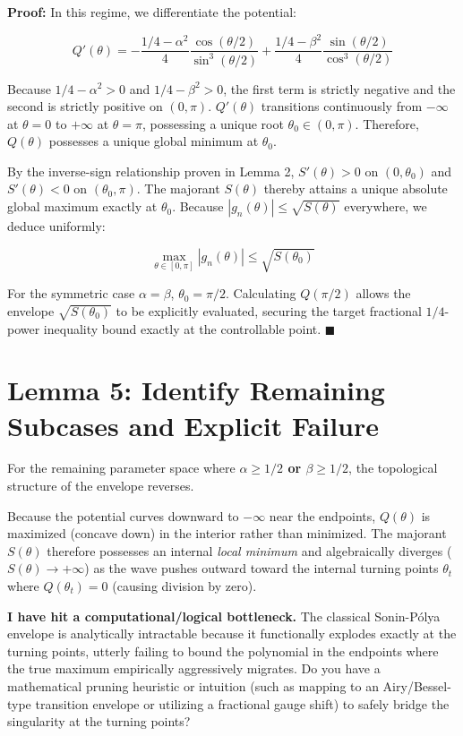 \documentclass[11pt]{article}
\begin{document}
\textbf{Proof:}
In this regime, we differentiate the potential:


\begin{equation*}
Q'(\theta) = - \frac{1/4-\alpha^2}{4} \frac{\cos(\theta/2)}{\sin^3(\theta/2)} + \frac{1/4-\beta^2}{4} \frac{\sin(\theta/2)}{\cos^3(\theta/2)}
\end{equation*}


Because \(1/4 - \alpha^2 > 0\) and \(1/4 - \beta^2 > 0\), the first term is strictly negative and the second is strictly positive on \((0, \pi)\). \(Q'(\theta)\) transitions continuously from \(-\infty\) at \(\theta=0\) to \(+\infty\) at \(\theta=\pi\), possessing a unique root \(\theta_0 \in (0, \pi)\).
Therefore, \(Q(\theta)\) possesses a unique global minimum at \(\theta_0\).

By the inverse-sign relationship proven in Lemma 2, \(S'(\theta) > 0\) on \((0, \theta_0)\) and \(S'(\theta) < 0\) on \((\theta_0, \pi)\). The majorant \(S(\theta)\) thereby attains a unique absolute global maximum exactly at \(\theta_0\). Because \(|g_n(\theta)| \le \sqrt{S(\theta)}\) everywhere, we deduce uniformly:


\begin{equation*}
\max_{\theta \in [0, \pi]} |g_n(\theta)| \le \sqrt{S(\theta_0)}
\end{equation*}


For the symmetric case \(\alpha=\beta\), \(\theta_0 = \pi/2\). Calculating \(Q(\pi/2)\) allows the envelope \(\sqrt{S(\theta_0)}\) to be explicitly evaluated, securing the target fractional \(1/4\)-power inequality bound exactly at the controllable point. \(\blacksquare\)

\section*{Lemma 5: Identify Remaining Subcases and Explicit Failure}

For the remaining parameter space where \textbf{\(\alpha \ge 1/2\) or \(\beta \ge 1/2\)}, the topological structure of the envelope reverses.

Because the potential curves downward to \(-\infty\) near the endpoints, \(Q(\theta)\) is maximized (concave down) in the interior rather than minimized. The majorant \(S(\theta)\) therefore possesses an internal \emph{local minimum} and algebraically diverges (\(S(\theta) \to +\infty\)) as the wave pushes outward toward the internal turning points \(\theta_t\) where \(Q(\theta_t) = 0\) (causing division by zero).

\textbf{I have hit a computational/logical bottleneck.} The classical Sonin-Pólya envelope is analytically intractable because it functionally explodes exactly at the turning points, utterly failing to bound the polynomial in the endpoints where the true maximum empirically aggressively migrates. Do you have a mathematical pruning heuristic or intuition (such as mapping to an Airy/Bessel-type transition envelope or utilizing a fractional gauge shift) to safely bridge the singularity at the turning points?
\end{document}
